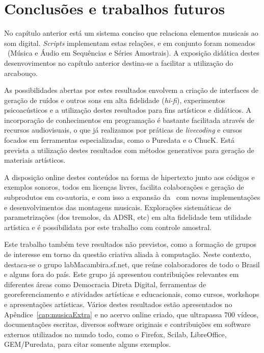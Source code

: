 \chapter{Conclusões e trabalhos futuros} %
\label{cap:conclusao}

No capítulo anterior está um sistema conciso
que relaciona elementos musicais ao som digital. \emph{Scripts} 
implementam estas relações, e em conjunto foram nomeados \massa\ (Música
e Áudio em Sequências e Séries Amostrais). 
A exposição didática destes desenvovimentos no
capítulo anterior destina-se a facilitar a utilização
do arcabouço.

As possibilidades abertas por estes resultados envolvem a criação de interfaces de geração de ruídos e outros sons em alta fidelidade (\emph{hi-fi}), experimentos psicoacústicos e a utilização destes resultados para fins artísticos e didáticos. A incorporação de conhecimentos
em programação é bastante facilitada através de recursos audiovisuais, o que já realizamos por práticas de \emph{livecoding} e cursos focados em ferramentas especializadas, como o Puredata e o ChucK.
Está prevista a utilização destes resultados com
métodos generativos para geração de materiais artísticos.

A disposição online destes conteúdos na forma de hipertexto junto aos códigos e exemplos sonoros, todos em licenças livres, facilita colaborações e geração de subprodutos em co-autoria, e com isso a expansão da \massa\ com novas implementações e desenvolvimentos das montagens musicais.
Explorações sistemáticas de parametrizações (dos tremolos, da ADSR, etc) em alta fidelidade tem utilidade artística e é possibilidata por este trabalho com controle amostral. 

Este trabalho também teve resultados não previstos, como a formação de grupos
de interesse em torno da questão criativa aliada à computação.
Neste contexto, destaca-se o grupo
labMacambira.sf.net, que reúne colaboradores de todo o Brasil e alguns fora do país.
Este grupo
já apresentou contribuições relevantes em diferentes áreas
como Democracia Direta Digital, ferramentas de georeferenciamento e
atividades artísticas e educacionais, como cursos, workshops e apresentações artísticas. Vários destes resultados estão apresentados no Apêndice~\ref{cap:musicaExtra} e no acervo online criado, que ultrapassa 700 vídeos, documentações escritas, diversos software originais e contribuições em software externos utilizados no mundo todo, como o Firefox, Scilab, LibreOffice, GEM/Puredata, para citar somente alguns exemplos.\cite{siteLM,wikiLM,vimeoLM}

